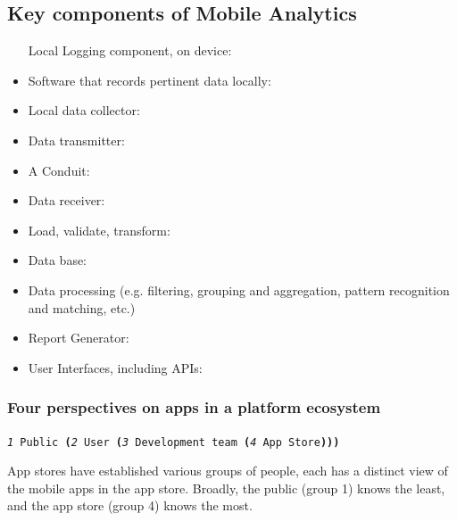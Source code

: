 \subsection{Key components of Mobile Analytics}
\begin{itemize}
    \item [Local] Logging component, on device:
    \item Software that records pertinent data locally:
    \item Local data collector:
    \item Data transmitter:
    \item A Conduit:
    \item Data receiver:
    \item Load, validate, transform:
    \item Data base:
    \item Data processing (e.g. filtering, grouping and aggregation, pattern recognition and matching, etc.)
    \item Report Generator:
    \item User Interfaces, including APIs:
\end{itemize}

\subsubsection{Four perspectives on apps in a platform ecosystem}
\large{\texttt{\emph{1} Public \textbf{(}\emph{2} User \textbf{(}\emph{3} Development team \textbf{(}\emph{4} App Store\textbf{)))}}}

App stores have established various groups of people, each has a distinct view of the mobile apps in the app store. Broadly, the public (group 1) knows the least, and the app store (group 4) knows the most.

